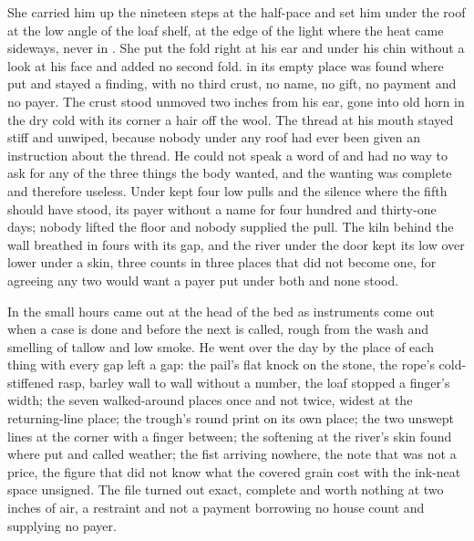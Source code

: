 She carried him up the nineteen steps at the half-pace and set him under the roof at the low angle of the loaf shelf, at the edge of the light where the heat came sideways, never in . She put the fold right at his ear and under his chin without a look at his face and added no second fold.  in its empty place was found where put and stayed a finding, with no third crust, no name, no gift, no payment and no payer. The crust stood unmoved two inches from his ear, gone into old horn in the dry cold with its corner a hair off the wool. The thread at his mouth stayed stiff and unwiped, because nobody under any roof had ever been given an instruction about the thread. He could not speak a word of  and had no way to ask for any of the three things the body wanted, and the wanting was complete and therefore useless. Under   kept four low pulls and the silence where the fifth should have stood, its payer without a name for four hundred and thirty-one days; nobody lifted the floor and nobody supplied the pull. The kiln behind the wall breathed in fours with its gap, and the river under the door kept its low over lower under a skin, three counts in three places that did not become one, for agreeing any two would want a payer put under both and none stood.

\scenebreak

In the small hours  came out at the head of the bed as instruments come out when a case is done and before the next is called, rough from the wash and smelling of tallow and low smoke. He went over the day by the place of each thing with every gap left a gap: the pail's flat knock on the stone, the rope's cold-stiffened rasp, barley wall to wall without a number, the loaf stopped a finger's width; the seven walked-around places once and not twice, widest at the returning-line place; the trough's round print on its own place; the two unswept lines at the corner with a finger between; the softening at the river's skin found where put and called weather; the fist arriving nowhere, the note that was not a price, the figure that did not know what the covered grain cost with the ink-neat space unsigned. The file turned out exact, complete and worth nothing at two inches of air, a restraint and not a payment borrowing no house count and supplying no payer.

